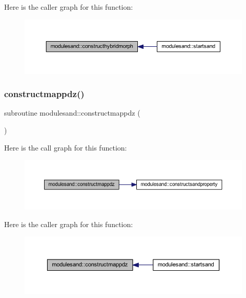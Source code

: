 Here is the caller graph for this function\+:\nopagebreak
\begin{figure}[H]
\begin{center}
\leavevmode
\includegraphics[width=350pt]{namespacemodulesand_a5038864653c40852814080f8d2e82d7b_icgraph}
\end{center}
\end{figure}
\mbox{\label{namespacemodulesand_a1fe3b75c21e01743ffaa043028b925b6}} 
\subsubsection{\texorpdfstring{constructmappdz()}{constructmappdz()}}
{\footnotesize\ttfamily subroutine modulesand\+::constructmappdz (\begin{DoxyParamCaption}{ }\end{DoxyParamCaption})\hspace{0.3cm}{\ttfamily [private]}}

Here is the call graph for this function\+:\nopagebreak
\begin{figure}[H]
\begin{center}
\leavevmode
\includegraphics[width=350pt]{namespacemodulesand_a1fe3b75c21e01743ffaa043028b925b6_cgraph}
\end{center}
\end{figure}
Here is the caller graph for this function\+:\nopagebreak
\begin{figure}[H]
\begin{center}
\leavevmode
\includegraphics[width=350pt]{namespacemodulesand_a1fe3b75c21e01743ffaa043028b925b6_icgraph}
\end{center}
\end{figure}
\mbox{\label{namespacemodulesand_a0db362913d03be6c3ddaab19327561ce}} 
